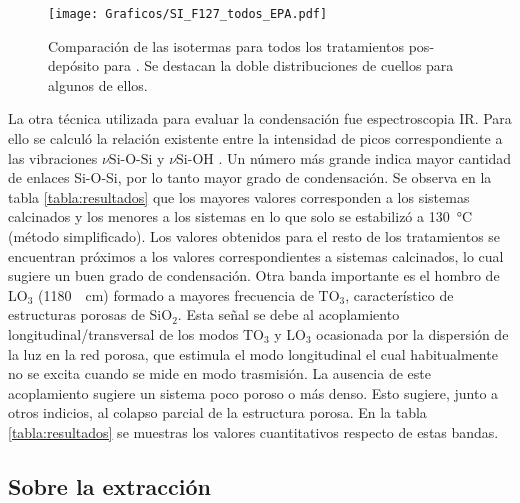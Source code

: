 			\begin{figure}[!th]
		 	   	   \begin{center}
		 	   	   \texttt{[image: Graficos/SI\_F127\_todos\_EPA.pdf]}
			   	   \caption[Comparación PEA tratamientos alternativos (F127)]{Comparación de las isotermas para todos los tratamientos pos-depósito para \pdmF\space. Se destacan la doble distribuciones de cuellos para algunos de ellos.}
				   \label{fig:todos_EPA_F127}	
				   \end{center}
				   \end{figure}	

		\pagebreak		   
				   
		La otra técnica utilizada para evaluar la condensación fue espectroscopia IR. Para ello se calculó la relación existente entre la intensidad de picos correspondiente a las vibraciones $\nu{\text{Si-O-Si}}$ y $\nu{\text{Si-OH}}$ \cite{Pai1986,Innocenzi2003}. Un número más grande indica mayor cantidad de enlaces Si-O-Si, por lo tanto mayor grado de condensación. Se observa en la tabla \ref{tabla:resultados} que los mayores valores corresponden a los sistemas calcinados y los menores a los sistemas en lo que solo se estabilizó a \SI{130}{\celsius} (método simplificado). Los valores obtenidos para el resto de los tratamientos se encuentran próximos a los valores correspondientes a sistemas calcinados, lo cual sugiere un buen grado de condensación.  Otra banda importante es el hombro de LO$_3$ (\SI{1180}{\per\cm}) formado a mayores frecuencia de TO$_3$, característico de estructuras porosas de SiO$_2$. Esta señal se debe al acoplamiento longitudinal/transversal de los modos TO$_3$ y LO$_3$ ocasionada por la dispersión de la luz en la red porosa, que estimula el modo longitudinal el cual habitualmente no se excita cuando se mide en modo trasmisión\cite{Innocenzi2003,Lange1990,Lange1989}. La ausencia de este acoplamiento sugiere un sistema poco poroso o más denso. Esto sugiere, junto a otros indicios, al colapso parcial de la estructura porosa. En la tabla \ref{tabla:resultados} se muestras los valores cuantitativos respecto de estas bandas.	   

	\subsection{Sobre la extracción}

